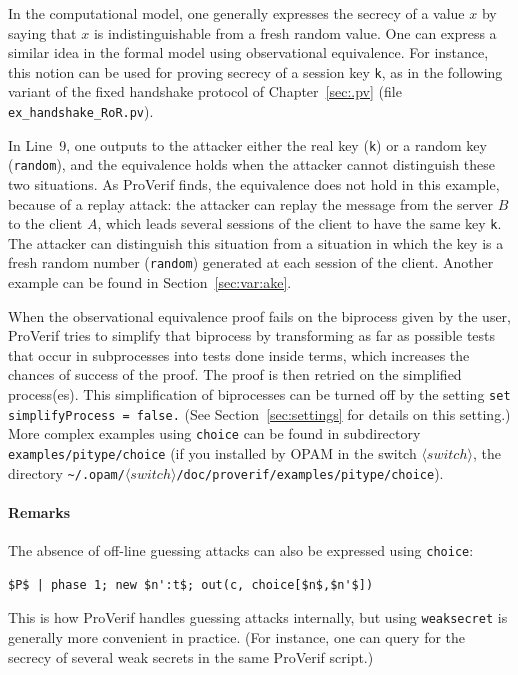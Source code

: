 \documentclass{book}
\newcommand{\nonterm}[1]{\langle\mathit{#1}\rangle}
\newcommand{\switchdir}{\nonterm{switch}}
\newcommand{\opamsubdir}[1]{\nolinkurl{~/.opam/}$\switchdir$\nolinkurl{/#1}}
\begin{document}
In the computational model, one generally expresses the secrecy of a value
$x$ by saying that $x$ is indistinguishable from a fresh random
value. One can express a similar idea in the formal model using
observational equivalence. For instance, this notion can be used for
proving secrecy of a session key \lstinline!k!, as in the following
variant of the fixed handshake protocol of Chapter~\ref{sec:.pv}
(file \texttt{{\docexdir}ex\_handshake\_RoR.pv}).
%

%
In Line~9, one outputs to the attacker either the real key (\lstinline!k!)
or a random key (\lstinline!random!), and the equivalence holds when the
attacker cannot distinguish these two situations.
As ProVerif finds, the equivalence does not hold
in this example, because of a replay
attack: the attacker can replay the message from the server $B$ to
the client $A$, which leads several sessions of the client to have the
same key \lstinline!k!. The attacker can distinguish this situation
from a situation in which the key is a fresh random number
(\lstinline!random!) generated at each session of the client.
Another example can be found in Section~\ref{sec:var:ake}.

When the observational equivalence proof fails on the biprocess
given by the user, ProVerif tries to simplify that biprocess
by transforming as far as possible tests that occur in subprocesses
into tests done inside terms, which increases the chances of success
of the proof. The proof is then retried on the simplified process(es).
This simplification of biprocesses can be turned off by the setting
\lstinline!set simplifyProcess = false.! (See Section~\ref{sec:settings}
for details on this setting.)
More complex examples using \lstinline!choice! can be found in
subdirectory {\tt examples/pitype/choice} (if you installed by OPAM
in the switch $\switchdir$, the directory \opamsubdir{doc/proverif/examples/pitype/choice}).

\paragraph{Remarks}

The absence of off-line guessing attacks can also be expressed using
\lstinline!choice!:
\begin{lstlisting}[numbers=none]
  $P$ | phase 1; new $n':t$; out(c, choice[$n$,$n'$])
\end{lstlisting}
This is how ProVerif handles guessing attacks internally, but using
\lstinline!weaksecret! is generally more convenient in practice. (For
instance, one can query for the secrecy of several weak secrets in the
same ProVerif script.)
\end{document}
